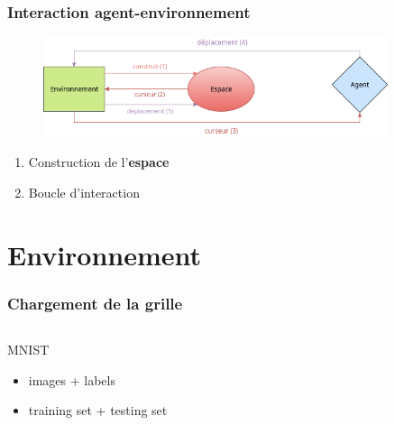 \documentclass{beamer}
\begin{document}
\begin{frame}
    \frametitle{Interaction agent-environnement}
    \center
    \begin{figure}
        \includegraphics[width=0.9\textwidth]{agent_env_loop.png}
    \end{figure}
    \vspace{3em}
    \begin{enumerate}
        \item Construction de l'\textbf{espace}
        \item Boucle d'interaction
    \end{enumerate}
\end{frame}

\section{Environnement}

\begin{frame}
    \frametitle{Chargement de la grille}
    \begin{columns}[c]
        \begin{column}{.48\textwidth}
            \begin{block}{MNIST}
                \begin{itemize}
                    \item images + labels
                    \item training set + testing set
                \end{itemize}
            \end{block}
        \end{column}
    \end{columns}
\end{frame}
\end{document}
